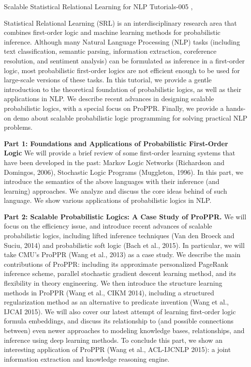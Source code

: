 \begin{tutorial}
  {Scalable Statistical Relational Learning for NLP}
  {Tutorials-005}
  {\daydateyear, \tutorialafternoontime}
  {\TutLocE}

Statistical Relational Learning (SRL) is an interdisciplinary research area that combines first-order logic and machine learning methods for probabilistic inference. Although many Natural Language Processing (NLP) tasks (including text classification, semantic parsing, information extraction, coreference resolution, and sentiment analysis) can be formulated as inference in a first-order logic, most probabilistic first-order logics are not efficient enough to be used for large-scale versions of these tasks. In this tutorial, we provide a gentle introduction to the theoretical foundation of probabilistic logics, as well as their applications in NLP. We describe recent advances in designing scalable probabilistic logics, with a special focus on ProPPR. Finally, we provide a hands-on demo about scalable probabilistic logic programming for solving practical NLP problems.

{\bfseries Part 1: Foundations and Applications of Probabilistic First-Order Logic} We will provide a brief review of some first-order learning systems that have been developed in the past: Markov Logic Networks (Richardson and Domingos, 2006), Stochastic Logic Programs (Muggleton, 1996). In this part, we introduce the semantics of the above languages with their inference (and learning) approaches. We analyze and discuss the core ideas behind of such language. We show various applications of probabilistic logics in NLP.

{\bfseries Part 2: Scalable Probabilistic Logics: A Case Study of ProPPR.} We will focus on the efficiency issue, and introduce recent advances of scalable probabilistic logics, including lifted inference techniques (Van den Broeck and Suciu, 2014) and probabilistic soft logic (Bach et al., 2015). In particular, we will take CMU's ProPPR (Wang et al., 2013) as a case study. We describe the main contributions of ProPPR: including its approximate personalized PageRank inference scheme, parallel stochastic gradient descent learning method, and its flexibility in theory engineering. We then introduce the structure learning methods in ProPPR (Wang et al., CIKM 2014), including a structured regularization method as an alternative to predicate invention (Wang et al., IJCAI 2015). We will also cover our latest attempt of learning first-order logic formula embeddings, and discuss its relationship to (and possible connections between) even newer approaches to modeling knowledge bases, relationships, and inference using deep learning methods. To conclude this part, we show an interesting application of ProPPR (Wang et al., ACL-IJCNLP 2015): a joint information extraction and knowledge reasoning engine.


\end{tutorial}
